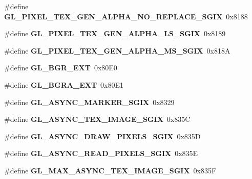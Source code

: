 \begin{DoxyCompactItemize}
\item 
\#define {\bfseries G\+L\+\_\+\+P\+I\+X\+E\+L\+\_\+\+T\+E\+X\+\_\+\+G\+E\+N\+\_\+\+A\+L\+P\+H\+A\+\_\+\+N\+O\+\_\+\+R\+E\+P\+L\+A\+C\+E\+\_\+\+S\+G\+I\+X}~0x8188\label{_s_d_l__opengl_8h_a38e672552a8516cf7fc12dcd3c1b945b}

\item 
\#define {\bfseries G\+L\+\_\+\+P\+I\+X\+E\+L\+\_\+\+T\+E\+X\+\_\+\+G\+E\+N\+\_\+\+A\+L\+P\+H\+A\+\_\+\+L\+S\+\_\+\+S\+G\+I\+X}~0x8189\label{_s_d_l__opengl_8h_ab0ea0d58de4c92c732374688ece97379}

\item 
\#define {\bfseries G\+L\+\_\+\+P\+I\+X\+E\+L\+\_\+\+T\+E\+X\+\_\+\+G\+E\+N\+\_\+\+A\+L\+P\+H\+A\+\_\+\+M\+S\+\_\+\+S\+G\+I\+X}~0x818\+A\label{_s_d_l__opengl_8h_afdf3d0bf7994f322ea161e8fb6eb632b}

\item 
\#define {\bfseries G\+L\+\_\+\+B\+G\+R\+\_\+\+E\+X\+T}~0x80\+E0\label{_s_d_l__opengl_8h_a32be6e62b1a51becc92406849a539734}

\item 
\#define {\bfseries G\+L\+\_\+\+B\+G\+R\+A\+\_\+\+E\+X\+T}~0x80\+E1\label{_s_d_l__opengl_8h_afbca5fa2e51fe8d9a1a33d2989cc5a9d}

\item 
\#define {\bfseries G\+L\+\_\+\+A\+S\+Y\+N\+C\+\_\+\+M\+A\+R\+K\+E\+R\+\_\+\+S\+G\+I\+X}~0x8329\label{_s_d_l__opengl_8h_a41a42602afc6f98a6a49be861ab4a464}

\item 
\#define {\bfseries G\+L\+\_\+\+A\+S\+Y\+N\+C\+\_\+\+T\+E\+X\+\_\+\+I\+M\+A\+G\+E\+\_\+\+S\+G\+I\+X}~0x835\+C\label{_s_d_l__opengl_8h_a500654aec03cc7a86e290fea2e6a38d0}

\item 
\#define {\bfseries G\+L\+\_\+\+A\+S\+Y\+N\+C\+\_\+\+D\+R\+A\+W\+\_\+\+P\+I\+X\+E\+L\+S\+\_\+\+S\+G\+I\+X}~0x835\+D\label{_s_d_l__opengl_8h_a5ae8694d73094a10f093103018fb5477}

\item 
\#define {\bfseries G\+L\+\_\+\+A\+S\+Y\+N\+C\+\_\+\+R\+E\+A\+D\+\_\+\+P\+I\+X\+E\+L\+S\+\_\+\+S\+G\+I\+X}~0x835\+E\label{_s_d_l__opengl_8h_a5767d42da276fa09870f913ec29b78db}

\item 
\#define {\bfseries G\+L\+\_\+\+M\+A\+X\+\_\+\+A\+S\+Y\+N\+C\+\_\+\+T\+E\+X\+\_\+\+I\+M\+A\+G\+E\+\_\+\+S\+G\+I\+X}~0x835\+F\label{_s_d_l__opengl_8h_a54644a094e18a9b31ebe801fb249df57}


\end{DoxyCompactItemize}
